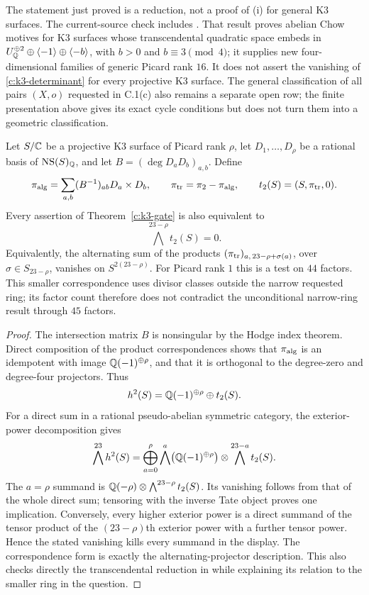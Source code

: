 The statement just proved is a reduction, not a proof of (i) for general K3 surfaces. The current-source check includes \citet[Theorem L, explicitly Theorem 9.7 and Corollary 9.8]{c_floccarifu2026}. That result proves abelian Chow motives for K3 surfaces whose transcendental quadratic space embeds in $U_\mathbb Q^{\oplus2}\oplus\langle-1\rangle\oplus\langle-b\rangle$, with $b>0$ and $b\equiv3\pmod4$; it supplies new four-dimensional families of generic Picard rank $16$. It does not assert the vanishing of \eqref{c:k3-determinant} for every projective K3 surface. The general classification of all pairs $(X,o)$ requested in C.1(c) also remains a separate open row; the finite presentation above gives its exact cycle conditions but does not turn them into a geometric classification.

\begin{corollary}
\label{c:k3-transcendental-gate}
Let $S/\mathbb C$ be a projective K3 surface of Picard rank $\rho$, let
$D_1,\ldots,D_\rho$ be a rational basis of $\operatorname{NS}(S)_\mathbb Q$,
and let $B=(\deg D_aD_b)_{a,b}$.  Define
\[
 \pi_{\rm alg}=\sum_{a,b}(B^{-1})_{ab}D_a\times D_b,
 \qquad \pi_{\rm tr}=\pi_2-\pi_{\rm alg},\qquad
 t_2(S)=(S,\pi_{\rm tr},0).
\]
Every assertion of Theorem~\ref{c:k3-gate} is also equivalent to
\[
 \bigwedge^{23-\rho}t_2(S)=0.
\]
Equivalently, the alternating sum of the products
$(\pi_{\rm tr})_{a,\,23-\rho+\sigma(a)}$, over
$\sigma\in S_{23-\rho}$, vanishes on $S^{2(23-\rho)}$.
For Picard rank $1$ this is a test on $44$ factors.  This smaller
correspondence uses divisor classes outside the narrow requested
ring; its factor count therefore does not contradict the unconditional
narrow-ring result through $45$ factors.
\end{corollary}

\begin{proof}
The intersection matrix $B$ is nonsingular by the Hodge index
theorem.  Direct composition of the product correspondences shows
that $\pi_{\rm alg}$ is an idempotent with image $\mathbb Q(-1)^{\oplus\rho}$,
and that it is orthogonal to the degree-zero and degree-four
projectors.  Thus
\[
 h^2(S)=\mathbb Q(-1)^{\oplus\rho}\oplus t_2(S).
\]
For a direct sum in a rational pseudo-abelian symmetric category,
the exterior-power decomposition gives
\[
 \bigwedge^{23}h^2(S)
 =\bigoplus_{a=0}^{\rho}
   \bigwedge^a\bigl(\mathbb Q(-1)^{\oplus\rho}\bigr)
       \otimes\bigwedge^{23-a}t_2(S).
\]
The $a=\rho$ summand is
$\mathbb Q(-\rho)\otimes\bigwedge^{23-\rho}t_2(S)$.
Its vanishing follows from that of the whole direct sum; tensoring
with the inverse Tate object proves one implication.
Conversely, every higher exterior power is a direct summand of
the tensor product of the $(23-\rho)$th exterior power with a
further tensor power.  Hence the stated vanishing kills every
summand in the display.  The correspondence form is exactly the
alternating-projector description.  This also checks directly the
transcendental reduction in \citet[\S2.5, pp.~506--507, equation~(7)]{c_yin2015}
while explaining its relation to the smaller ring in the question.
\end{proof}



